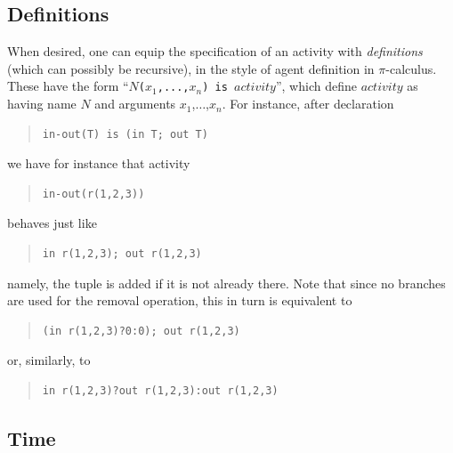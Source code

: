 \documentclass[12pt,a4paper,twoside,openright]{book}
\begin{document}
\subsection{Definitions}

When desired, one can equip the specification of an activity with \emph{definitions} (which can possibly be recursive), in the style of agent definition in $\pi$-calculus.
%
These have the form ``\texttt{$N$($x_1$,...,$x_n$) is $\mathit{activity}$}'', which define $\mathit{activity}$ as having name $N$ and arguments  $x_1$,$\ldots$,$x_n$.
%
For instance, after declaration
%
{\begin{quote}
\begin{verbatim}
in-out(T) is (in T; out T)
\end{verbatim}\end{quote}
}
\noindent we have for instance that activity
{\begin{quote}
\begin{verbatim}
in-out(r(1,2,3))
\end{verbatim}\end{quote}
}
\noindent
behaves just like 
{\begin{quote}
\begin{verbatim}
in r(1,2,3); out r(1,2,3)
\end{verbatim}\end{quote}
}
\noindent
namely, the tuple is added if it is not already there.
%
Note that since no branches are used for the removal operation, this in turn is equivalent to
{\begin{quote}
\begin{verbatim}
(in r(1,2,3)?0:0); out r(1,2,3)
\end{verbatim}\end{quote}
}
\noindent
or, similarly, to 
{\begin{quote}
\begin{verbatim}
in r(1,2,3)?out r(1,2,3):out r(1,2,3)
\end{verbatim}\end{quote}
}

\subsection{Time}
\end{document}
